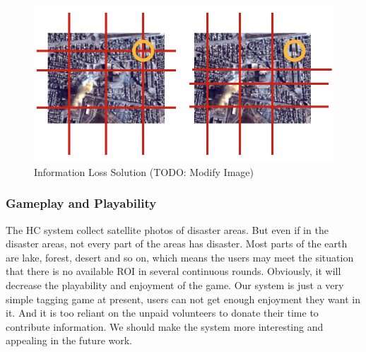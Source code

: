   \begin{figure}[htp]
  \centering
  \includegraphics[width=0.5\columnwidth]{figures/information_loss}
  \caption{Information Loss Solution (TODO: Modify Image)}
  \label{fig:information_loss}
  \end{figure}

  \subsubsection{Gameplay and Playability}
  The HC system collect satellite photos of disaster areas. But even if in the disaster areas, 
  not every part of the areas has disaster. Most parts of the earth are lake, forest, 
  desert and so on, which means the users may meet the situation that there is no available 
  ROI in several continuous rounds. Obviously, it will decrease the playability and enjoyment of the game.
  Our system is just a very simple tagging game at present, users can not get enough enjoyment they want in it. 
  And it is too reliant on the unpaid volunteers to donate their time to contribute information. 
  We should make the system more interesting and appealing in the future work.
